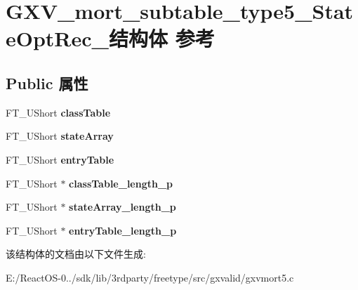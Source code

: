 \hypertarget{struct_g_x_v__mort__subtable__type5___state_opt_rec__}{}\section{G\+X\+V\+\_\+mort\+\_\+subtable\+\_\+type5\+\_\+\+State\+Opt\+Rec\+\_\+结构体 参考}
\label{struct_g_x_v__mort__subtable__type5___state_opt_rec__}
\subsection*{Public 属性}
\begin{DoxyCompactItemize}
\item 
\mbox{\label{struct_g_x_v__mort__subtable__type5___state_opt_rec___a9b5124ad7742d751b9063583eb8cda3d}} 
F\+T\+\_\+\+U\+Short {\bfseries class\+Table}
\item 
\mbox{\label{struct_g_x_v__mort__subtable__type5___state_opt_rec___a6799d05fa17deb25e779fc1c28029179}} 
F\+T\+\_\+\+U\+Short {\bfseries state\+Array}
\item 
\mbox{\label{struct_g_x_v__mort__subtable__type5___state_opt_rec___afee07205ffee1017850e002cdb7b1fdc}} 
F\+T\+\_\+\+U\+Short {\bfseries entry\+Table}
\item 
\mbox{\label{struct_g_x_v__mort__subtable__type5___state_opt_rec___a4cdd4222ba3452bf6c38cd85928aa842}} 
F\+T\+\_\+\+U\+Short $\ast$ {\bfseries class\+Table\+\_\+length\+\_\+p}
\item 
\mbox{\label{struct_g_x_v__mort__subtable__type5___state_opt_rec___a10b9d39c266899e292ac19028f635e4f}} 
F\+T\+\_\+\+U\+Short $\ast$ {\bfseries state\+Array\+\_\+length\+\_\+p}
\item 
\mbox{\label{struct_g_x_v__mort__subtable__type5___state_opt_rec___a06cedaf9a66589e0c8fd709c9e6249b4}} 
F\+T\+\_\+\+U\+Short $\ast$ {\bfseries entry\+Table\+\_\+length\+\_\+p}
\end{DoxyCompactItemize}


该结构体的文档由以下文件生成\+:\begin{DoxyCompactItemize}
\item 
E\+:/\+React\+O\+S-\/0../sdk/lib/3rdparty/freetype/src/gxvalid/gxvmort5.\+c\end{DoxyCompactItemize}
